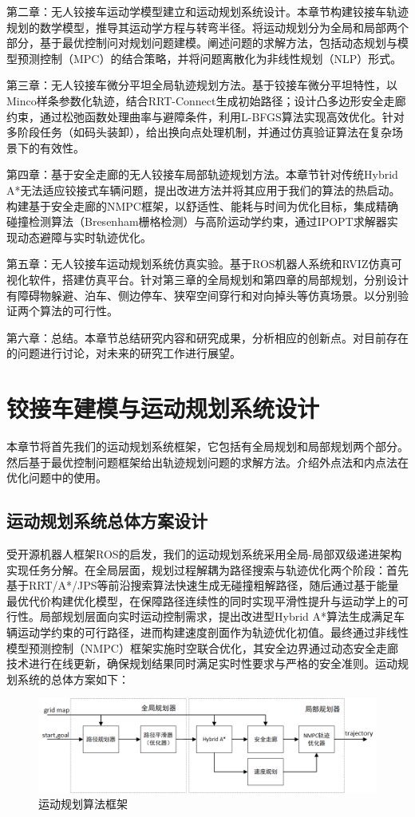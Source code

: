 \documentclass[master,academic]{ysuthesis} %
\begin{document}
	第二章：无人铰接车运动学模型建立和运动规划系统设计​。本章节构建铰接车轨迹规划的数学模型，推导其运动学方程与转弯半径。将运动规划分为全局和局部两个部分，基于最优控制问对规划问题建模。阐述问题的求解方法，包括动态规划与模型预测控制（MPC）的结合策略，并将问题离散化为非线性规划（NLP）形式。

	第三章：无人铰接车微分平坦全局轨迹规划方法​。基于铰接车微分平坦特性，以Minco样条参数化轨迹，结合RRT-Connect生成初始路径；设计凸多边形安全走廊约束，通过松弛函数处理曲率与避障条件，利用L-BFGS算法实现高效优化。针对多阶段任务（如码头装卸），给出换向点处理机制，并通过仿真验证算法在复杂场景下的有效性。

	第四章：基于安全走廊的无人铰接车局部轨迹规划方法​。本章节针对传统Hybrid A*无法适应铰接式车辆问题，提出改进方法并将其应用于我们的算法的热启动。构建基于安全走廊的NMPC框架，以舒适性、能耗与时间为优化目标，集成精确碰撞检测算法（Bresenham栅格检测）与高阶运动学约束，通过IPOPT求解器实现动态避障与实时轨迹优化。

	第五章：无人铰接车运动规划系统仿真实验​。基于ROS机器人系统和RVIZ仿真可视化软件，搭建仿真平台。针对第三章的全局规划和第四章的局部规划，分别设计有障碍物躲避、泊车、侧边停车、狭窄空间穿行和对向掉头等仿真场景。以分别验证两个算法的可行性。

	第六章：总结​。本章节总结研究内容和研究成果，分析相应的创新点。对目前存在的问题进行讨论，对未来的研究工作进行展望。

	\chapter{铰接车建模与运动规划系统设计}
	本章节将首先我们的运动规划系统框架，它包括有全局规划和局部规划两个部分。然后基于最优控制问题框架给出轨迹规划问题的求解方法。介绍外点法和内点法在优化问题中的使用。
	\section{运动规划系统总体方案设计}
	受开源机器人框架ROS的启发，我们的运动规划系统采用全局-局部双级递进架构实现任务分解。在全局层面，规划过程解耦为路径搜索与轨迹优化两个阶段：首先基于RRT/A*/JPS等前沿搜索算法快速生成无碰撞粗解路径，随后通过基于能量最优代价构建优化模型，在保障路径连续性的同时实现平滑性提升与运动学上的可行性。局部规划层面向实时运动控制需求，提出改进型Hybrid A*算法生成满足车辆运动学约束的可行路径，进而构建速度剖面作为轨迹优化初值。最终通过非线性模型预测控制（NMPC）框架实施时空联合优化，其安全边界通过动态安全走廊技术进行在线更新，确保规划结果同时满足实时性要求与严格的安全准则。运动规划系统的总体方案如下：
		\begin{figure}[!ht]
			\centering
			\includegraphics[width=1.0\textwidth]{运动规划算法框架.png}
			\caption{运动规划算法框架}
			\label{fig:运动规划算法框架}
		\end{figure}
\end{document}
